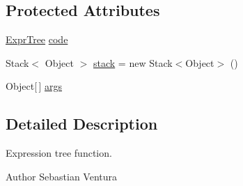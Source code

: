 \subsection*{Protected Attributes}
\begin{DoxyCompactItemize}
\item 
\hyperlink{classnet_1_1sf_1_1jclec_1_1exprtree_1_1_expr_tree}{Expr\-Tree} \hyperlink{classnet_1_1sf_1_1jclec_1_1exprtree_1_1fun_1_1_expr_tree_function_a148bc528b69b2c629888767cc5e9adbc}{code}
\item 
Stack$<$ Object $>$ \hyperlink{classnet_1_1sf_1_1jclec_1_1exprtree_1_1fun_1_1_expr_tree_function_aa023e2e693295e66c955ccdff8069274}{stack} = new Stack$<$Object$>$ ()
\item 
Object\mbox{[}$\,$\mbox{]} \hyperlink{classnet_1_1sf_1_1jclec_1_1exprtree_1_1fun_1_1_expr_tree_function_af323c93fc6b862090d0b97f2c774443a}{args}
\end{DoxyCompactItemize}


\subsection{Detailed Description}
Expression tree function.

\begin{DoxyAuthor}{Author}
Sebastian Ventura 
\end{DoxyAuthor}



